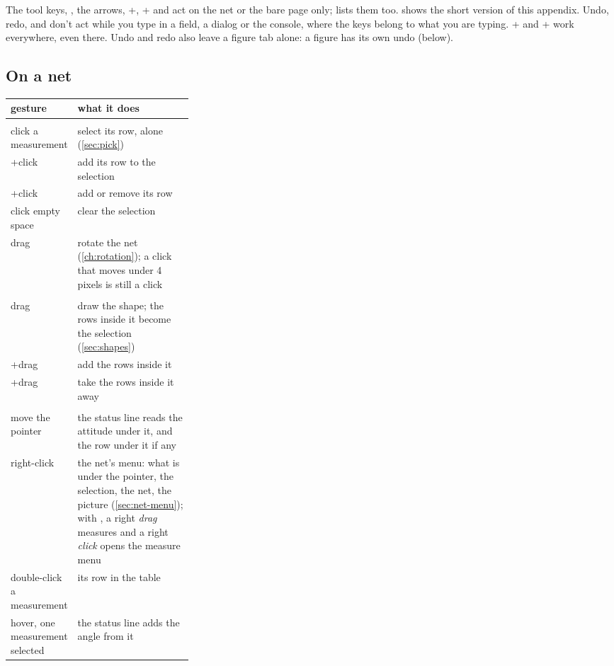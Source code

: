 The tool keys, , the arrows, +, + and  act on the net or the bare page only;  lists them too.
 shows the short version of this appendix. Undo, redo,  and  don't act while you type in a field, a dialog or the console, where
the keys belong to what you are typing. + and + work everywhere,
even there. Undo and redo also leave a figure tab alone: a figure has its own undo (below).

\subsection{On a net}

\begin{center}\small
\begin{tabularx}{\linewidth}{@{}>{\raggedright}p{0.3\linewidth}L@{}}\toprule
\sffamily\bfseries gesture & \sffamily\bfseries what it does \\\midrule
{} \\
click a measurement & select its row, alone (\cref{sec:pick}) \\
+click & add its row to the selection \\
+click & add or remove its row \\
click empty space & clear the selection \\
drag & rotate the net (\cref{ch:rotation}); a click that moves under 4 pixels is still a click \\
 \\
drag & draw the shape; the rows inside it become the selection (\cref{sec:shapes}) \\
+drag & add the rows inside it \\
+drag & take the rows inside it away \\
 \\
move the pointer & the status line reads the attitude under it, and the row under it if any \\
right-click & the net's menu: what is under the pointer, the selection, the net, the picture (\cref{sec:net-menu}); with , a right \emph{drag} measures and a right \emph{click} opens the measure menu \\
double-click a measurement & its row in the table \\
hover, one measurement selected & the status line adds the angle from it \\
\bottomrule\end{tabularx}
\end{center}

